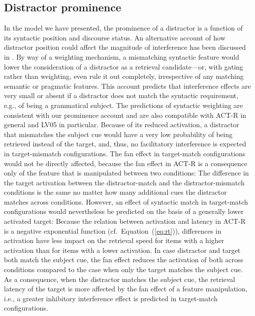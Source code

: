 \documentclass{cambridge7A}\usepackage[]{graphicx}\usepackage[]{color}
\begin{document}
\subsection{Distractor prominence}
In the model we have presented, the prominence of a distractor is a function of its  syntactic position and  discourse status.
An alternative account of how distractor position could affect the magnitude of interference has been discussed in \cite{VanDykeMcElree2011}. By way of a weighting mechanism, a mismatching syntactic feature would lower the consideration of a distractor as a retrieval candidate---or, with gating rather than weighting, even rule it out completely, irrespective of any matching semantic or pragmatic features. 
This account predicts that interference effects are very small or absent if a distractor does not match the syntactic requirement, e.g., of being a grammatical subject. 
The predictions of  syntactic weighting are consistent with our prominence account and are also compatible with ACT-R in general and LV05 in particular. Because of its reduced activation, a distractor that mismatches the subject cue would have a very low probability of being retrieved instead of the target, and, thus, no facilitatory interference is expected in target-mismatch configurations. 
The fan effect in target-match configurations would not be directly affected,
because the fan effect in ACT-R is a consequence only of the feature that is manipulated between two conditions: The difference in the target activation between the distractor-match and the distractor-mismatch conditions is the same no matter how many additional cues the distractor matches across conditions.
However, an effect of syntactic match in target-match configurations would nevertheless be predicted on the basis of a generally lower activated target:
Because the relation between activation and latency in ACT-R is a negative exponential function (cf.\ Equation~(\ref{eq:rt})), differences in activation have less impact on the retrieval speed for items with a higher activation than for items with a lower activation.
In case distractor and target both match the subject cue, the fan effect reduces the activation of both  across conditions compared to the case when only the target matches the subject cue. As a consequence, when the distractor matches the subject cue, the retrieval latency of the target is more affected by the fan effect of a feature manipulation, i.e., a greater inhibitory interference effect is predicted in target-match configurations. 
\end{document}
